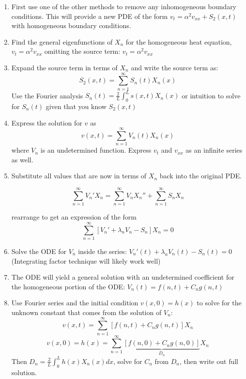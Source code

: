 \begin{enumerate}
    \begin{enumerate}
        \item First use one of the other methods to remove any inhomogeneous boundary conditions. This will provide a new PDE of the form $v_t=\alpha^2v_{xx}+S_2(x,t)$ with homogeneous boundary conditions.
        \item Find the general eigenfunctions of $X_n$ for the homogeneous heat equation, $v_t = \alpha^2 v_{xx}$  omitting the source term: $v_t=\alpha^2v_{xx}$
        \item Expand the source term in terms of $X_n$ and write the source term as:
        $$S_2(x,t)=\sum_{n=1}^\infty S_n(t)X_n(x)$$
        Use the Fourier analysis $S_n(t) = \frac{2}{L}\int_0^{L} s(x,t)X_n(x)$ or intuition to solve for $S_n(t)$ given that you know $S_2(x,t)$
        \item Express the solution for $v$ as
        $$v(x,t)=\sum_{n=1}^\infty V_n(t)X_n(x)$$
        where $V_n$ is an undetermined function.  Express $v_t$ and $v_{xx}$ as an infinite series as well.
        \item  Substitute all values that are now in terms of $X_n$ back into the original PDE.  
        
        $$\sum_{n=1}^\infty V_n'X_n = \sum_{n=1}^\infty V_n X_n'' + \sum_{n=1}^\infty S_nX_n$$
        
        rearrange to get an expression of the form
        $$\sum_{n=1}^\infty [V_n'+\lambda_n V_n - S_n]X_n=0$$
        \item Solve the ODE for $V_n$ inside the series: $V_n'(t)+\lambda_n V_n(t) - S_n(t)=0$ (Integrating factor technique will likely work well)
        \item The ODE will yield a general solution with an undetermined coefficient for the homogeneous portion of the ODE: $V_n(t) = f(n,t) + C_n g(n,t)$
        \item Use Fourier series and the initial condition $v(x,0)=h(x)$ to solve for the unknown constant that comes from the solution of $V_n$: 
        $$v(x,t) = \sum_{n=1}^\infty[f(n,t) + C_n g(n,t)]X_n$$
        $$v(x,0) = h(x) = \sum_{n=1}^\infty\underbrace{[f(n,0) + C_n g(n,0)]}_{D_n}X_n$$
        Then $D_n = \frac{2}{L}\int_0^{L} h(x)X_n(x)dx$, solve for $C_n$ from $D_n$, then write out full solution.
    \end{enumerate}
\end{enumerate}